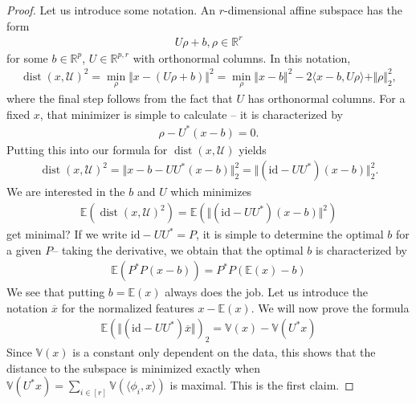 \documentclass{article}
\newcommand{\erw}{\mathbb{E}} %
\newcommand{\id}{\mathrm{id}}
\newcommand{\sprod}[1]{\langle #1 \rangle}
\newcommand{\calU}{\mathcal{U}}
\newcommand{\R}{\mathbb{R}}
\newcommand{\norm}[1]{\Vert #1 \Vert}
\DeclareMathOperator{\dist}{dist}
\begin{document}
\begin{proof}
Let us introduce some notation. An $r$-dimensional affine subspace has the form
\begin{align*}
    U\rho + b, \rho\in \R^r 
\end{align*}
for some $b\in\R^p$, $U\in \R^{p,r}$ with orthonormal columns. In this notation,
\begin{align*}
    \dist(x,\calU)^2 = \min_\rho \norm{x-(U\rho+b)}^2 =  \min_\rho \norm{x-b}^2 - 2\sprod{x-b,U\rho} + \norm{\rho}_2^2,
\end{align*}
where the final step follows from the fact that $U$ has orthonormal columns.
For a fixed $x$, that  minimizer is simple to calculate -- it is characterized by
\begin{align} \label{eq:scores}
    \rho-U^*(x-b)=0.
\end{align}
Putting this into our formula for $\dist(x,\calU)$ yields
\begin{align*}
   \dist(x,\calU)^2 = \norm{x-b -UU^*(x-b)}_2^2 = \norm{(\id-UU^*)(x-b)}_2^2. 
\end{align*}
We are interested in the $b$ and $U$ which minimizes
\begin{align*}
    \mathbb{E}(\dist(x,\calU)^2) = \mathbb{E}(\norm{(\id-UU^*)(x-b)}^2)
\end{align*}
get minimal? If we write $\id-UU^*=P$, it is simple to determine the optimal $b$ for a given $P$-- taking the derivative, we obtain that the optimal $b$ is characterized by
\begin{align*}
    \mathbb{E}(P^*P(x-b))=P^*P(\mathbb{E}(x)-b)
\end{align*}
We see that putting $b = \mathbb{E}(x)$ always does the job. Let us introduce the notation $\overline{x}$ for the normalized features $x- \mathbb{E}(x)$. We will now prove the formula 
\begin{align} \label{eq:minmax}
    \erw(\norm{(\id-UU^*)\overline{x}})_2 = \mathbb{V}(x) - \mathbb{V}(U^*x)
\end{align}
Since $\mathbb{V}(x)$ is a constant only dependent on the data, this shows that the distance to the subspace is minimized exactly when $\mathbb{V}(U^*x) = \sum_{i \in [r]}\mathbb{V}(\sprod{\phi_i,x})$ is maximal. This is the first claim.


\end{proof}
\end{document}
